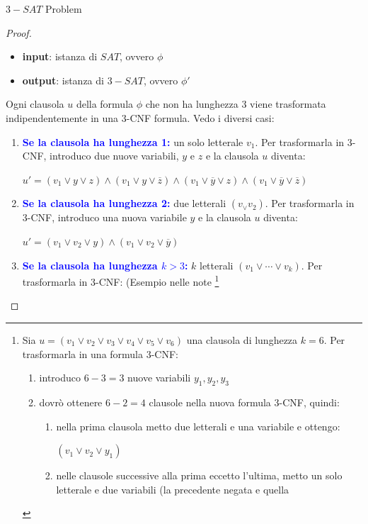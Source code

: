 \documentclass{article}  %
\theoremstyle{definition}
\begin{document}
\begin{theorem}{$3-SAT$ Problem}
\begin{proof}
\begin{itemize}
			\item \textbf{input}: istanza di $SAT$, ovvero $\phi$
			\item \textbf{output}: istanza di $3-SAT$, ovvero $\phi'$
		\end{itemize}
		Ogni clausola $u$ della formula $\phi$ che non ha lunghezza 3 viene trasformata indipendentemente in una 3-CNF
		formula. Vedo i diversi casi:
		\begin{enumerate}
			\item \textcolor{blue}{\textbf{Se la clausola ha lunghezza 1:}} un solo letterale $v_1$. Per trasformarla in 3-CNF,
			      introduco due nuove variabili, $y$ e $z$ e la clausola $u$ diventa:
			      \begin{center}
				      $u'=(v_1 \lor y \lor z)\land(v_1 \lor y \lor \overline{z})\land(v_1 \lor \overline{y} \lor z)\land(v_1 \lor \overline{y} \lor \overline{z})$
			      \end{center}
			\item \textcolor{blue}{\textbf{Se la clausola ha lunghezza 2:}} due letterali $(v_ \lor v_2)$. Per trasformarla in 3-CNF, introduco
			      una nuova variabile $y$ e la clausola $u$ diventa:
			      \begin{center}
				      $u'=(v_1 \lor v_2 \lor y)\land(v_1 \lor v_2 \lor \overline{y})$
			      \end{center}
			\item \textcolor{blue}{\textbf{Se la clausola ha lunghezza $k>3$:}} $k$ letterali $(v_1 \lor \cdots \lor v_k)$. Per trasformarla in 3-CNF:
			      (Esempio nelle note \footnote{
				      Sia $u=(v_1 \lor v_2 \lor v_3 \lor v_4 \lor v_5 \lor v_6)$ una clausola di lunghezza $k=6$. Per trasformarla in una formula 3-CNF:
				      \begin{enumerate}
					      \item introduco $6-3=3$ nuove variabili $y_1, y_2, y_3$
					      \item dovrò ottenere $6-2=4$ clausole nella nuova formula 3-CNF, quindi:
					            \begin{enumerate}
						            \item nella prima clausola metto due letterali e una variabile e ottengo:
						                  \begin{center}
							                  $(v_1 \lor v_2 \lor y_1)$
						                  \end{center}
						            \item nelle clausole successive alla prima eccetto l'ultima, metto un solo letterale e due variabili (la precedente negata e quella

\end{enumerate}
\end{enumerate}}
\end{enumerate}
\end{proof}
\end{theorem}
\end{document}

